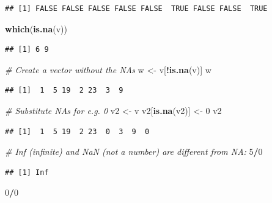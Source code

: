 \documentclass[
]{article}
\newenvironment{Shaded}{\begin{snugshade}}{\end{snugshade}}
\newcommand{\CommentTok}[1]{\textcolor[rgb]{0.56,0.35,0.01}{\textit{#1}}}
\newcommand{\DecValTok}[1]{\textcolor[rgb]{0.00,0.00,0.81}{#1}}
\newcommand{\KeywordTok}[1]{\textcolor[rgb]{0.13,0.29,0.53}{\textbf{#1}}}
\newcommand{\NormalTok}[1]{#1}
\newcommand{\OperatorTok}[1]{\textcolor[rgb]{0.81,0.36,0.00}{\textbf{#1}}}
\newcommand{\StringTok}[1]{\textcolor[rgb]{0.31,0.60,0.02}{#1}}
\begin{document}
\begin{verbatim}
## [1] FALSE FALSE FALSE FALSE FALSE  TRUE FALSE FALSE  TRUE
\end{verbatim}

\begin{Shaded}
\begin{Highlighting}[]
\KeywordTok{which}\NormalTok{(}\KeywordTok{is.na}\NormalTok{(v))}
\end{Highlighting}
\end{Shaded}

\begin{verbatim}
## [1] 6 9
\end{verbatim}

\begin{Shaded}
\begin{Highlighting}[]
\CommentTok{# Create a vector without the NAs}
\NormalTok{w <-}\StringTok{ }\NormalTok{v[}\OperatorTok{!}\KeywordTok{is.na}\NormalTok{(v)]}
\NormalTok{w}
\end{Highlighting}
\end{Shaded}

\begin{verbatim}
## [1]  1  5 19  2 23  3  9
\end{verbatim}

\begin{Shaded}
\begin{Highlighting}[]
\CommentTok{# Substitute NAs for e.g. 0}
\NormalTok{v2 <-}\StringTok{ }\NormalTok{v}
\NormalTok{v2[}\KeywordTok{is.na}\NormalTok{(v2)] <-}\StringTok{ }\DecValTok{0}
\NormalTok{v2}
\end{Highlighting}
\end{Shaded}

\begin{verbatim}
## [1]  1  5 19  2 23  0  3  9  0
\end{verbatim}

\begin{Shaded}
\begin{Highlighting}[]
\CommentTok{# Inf (infinite) and NaN (not a number) are different from NA:}
\DecValTok{5}\OperatorTok{/}\DecValTok{0}
\end{Highlighting}
\end{Shaded}

\begin{verbatim}
## [1] Inf
\end{verbatim}

\begin{Shaded}
\begin{Highlighting}[]
\DecValTok{0}\OperatorTok{/}\DecValTok{0}
\end{Highlighting}
\end{Shaded}
\end{document}
